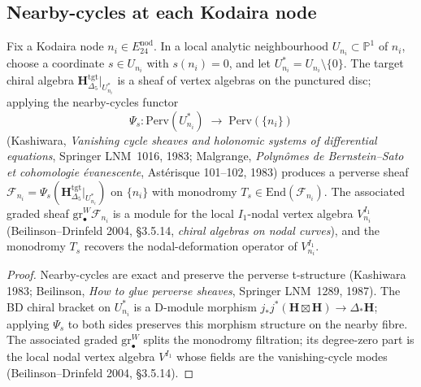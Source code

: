 \subsection{Nearby-cycles at each Kodaira node}
\label{subsec:nearby-cycles-each-node-k3}

\begin{lemma}
\label{lem:nearby-cycles-local-node}
Fix a Kodaira node $n_i\in E^{\mathrm{nod}}_{24}$. In a local analytic neighbourhood $U_{n_i}\subset\mathbb{P}^1$ of $n_i$, choose a coordinate $s\in U_{n_i}$ with $s(n_i)=0$, and let $U_{n_i}^* = U_{n_i}\setminus\{0\}$. The target chiral algebra $\mathbf{H}_{\Delta_5}^{\mathrm{tgt}}|_{U_{n_i}^*}$ is a sheaf of vertex algebras on the punctured disc; applying the nearby-cycles functor
\[
 \Psi_s\colon
 \mathrm{Perv}(U_{n_i}^*)
 \;\longrightarrow\;
 \mathrm{Perv}(\{n_i\})
\]
(Kashiwara, \emph{Vanishing cycle sheaves and holonomic systems of differential equations}, Springer LNM~1016, 1983; Malgrange, \emph{Polyn\^omes de Bernstein--Sato et cohomologie \'evanescente}, Ast\'erisque 101--102, 1983) produces a perverse sheaf $\mathcal{F}_{n_i}=\Psi_s(\mathbf{H}_{\Delta_5}^{\mathrm{tgt}}|_{U_{n_i}^*})$ on $\{n_i\}$ with monodromy $T_s\in\mathrm{End}(\mathcal{F}_{n_i})$. The associated graded sheaf $\mathrm{gr}^W_\bullet\mathcal{F}_{n_i}$ is a module for the local $I_1$-nodal vertex algebra $V^{I_1}_{n_i}$ (Beilinson--Drinfeld 2004, \S3.5.14, \emph{chiral algebras on nodal curves}), and the monodromy $T_s$ recovers the nodal-deformation operator of $V^{I_1}_{n_i}$.
\end{lemma}

\begin{proof}
Nearby-cycles are exact and preserve the perverse t-structure (Kashiwara 1983; Beilinson, \emph{How to glue perverse sheaves}, Springer LNM~1289, 1987). The BD chiral bracket on $U_{n_i}^*$ is a D-module morphism $j_*j^*(\mathbf{H}\boxtimes\mathbf{H})\to\Delta_*\mathbf{H}$; applying $\Psi_s$ to both sides preserves this morphism structure on the nearby fibre. The associated graded $\mathrm{gr}^W_\bullet$ splits the monodromy filtration; its degree-zero part is the local nodal vertex algebra $V^{I_1}$ whose fields are the vanishing-cycle modes (Beilinson--Drinfeld 2004, \S3.5.14).
\end{proof}

